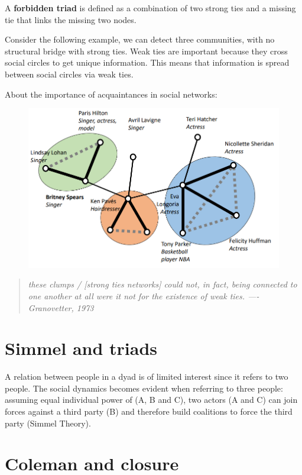 \documentclass[
  notitlepage,
  onecolumn,
  openany]{book}
\begin{document}
A \textbf{forbidden triad} is defined as a combination of two strong ties and
a missing tie that links the missing two nodes.

Consider the following example, we can detect three communities, with no
structural bridge with strong ties. Weak ties are important because they
cross social circles to get unique information. This means that
information is spread between social circles via weak ties.

About the importance of acquaintances in social networks:

\begin{figure}[h!]

{\centering \includegraphics[width=0.5\linewidth]{images/07-Triads and structural holes/Untitled 1} 

}

\end{figure}

\begin{quote}
\emph{these clumps / {[}strong ties networks{]} could not, in fact, being
connected to one another at all were it not for the existence of weak
ties. ---- Granovetter, 1973}
\end{quote}

\hypertarget{simmel-and-triads}{%
\section{Simmel and triads}\label{simmel-and-triads}}

A relation between people in a dyad is of limited interest since it
refers to two people. The social dynamics becomes evident when referring
to three people: assuming equal individual power of (A, B and C), two
actors (A and C) can join forces against a third party (B) and therefore
build coalitions to force the third party (Simmel Theory).

\hypertarget{coleman-and-closure}{%
\section{Coleman and closure}\label{coleman-and-closure}}
\end{document}
